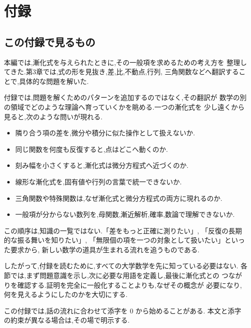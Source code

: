 
\chapter{付録}

\section*{この付録で見るもの}

本編では,漸化式を与えられたときに,その一般項を求めるための考え方を
整理してきた.第3章では,式の形を見抜き,差,比,不動点,行列,
三角関数などへ翻訳することで,具体的な問題を解いた.

付録では,問題を解くためのパターンを追加するのではなく,その翻訳が
数学の別の領域でどのような理論へ育っていくかを眺める.一つの漸化式を
少し遠くから見ると,次のような問いが現れる.

\begin{itemize}
  \item 隣り合う項の差を,微分や積分に似た操作として扱えないか.
  \item 同じ関数を何度も反復すると,点はどこへ動くのか.
  \item 刻み幅を小さくすると,漸化式は微分方程式へ近づくのか.
  \item 線形な漸化式を,固有値や行列の言葉で統一できないか.
  \item 三角関数や特殊関数は,なぜ漸化式と微分方程式の両方に現れるのか.
  \item 一般項が分からない数列を,母関数,漸近解析,確率,数論で理解できないか.
\end{itemize}

この順序は,知識の一覧ではない.「差をもっと正確に測りたい」,
「反復の長期的な振る舞いを知りたい」,
「無限個の項を一つの対象として扱いたい」といった要求から,
新しい数学の道具が生まれる流れを追うものである.

したがって,付録を読むために,すべての大学数学を先に知っている必要はない.
各節では,まず問題意識を示し,次に必要な用語を定義し,最後に漸化式との
つながりを確認する.証明を完全に一般化することよりも,なぜその概念が
必要になり,何を見えるようにしたのかを大切にする.

この付録では,話の流れに合わせて添字を $0$ から始めることがある.
本文と添字の約束が異なる場合は,その場で明示する.














